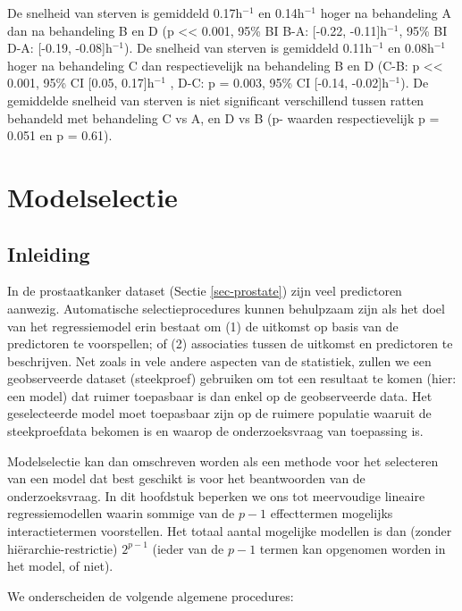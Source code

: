 \documentclass[
  dutch,
  letterpaper,
  12pt]{book}
\theoremstyle{definition}
\theoremstyle{definition}
\theoremstyle{definition}
\theoremstyle{remark}
\begin{document}
De snelheid van sterven is gemiddeld 0.17h\(^{-1}\) en 0.14h\(^{-1}\)
hoger na behandeling A dan na behandeling B en D (p \textless\textless{}
0.001, 95\% BI B-A: {[}-0.22, -0.11{]}h\(^{-1}\), 95\% BI D-A: {[}-0.19,
-0.08{]}h\(^{-1}\)). De snelheid van sterven is gemiddeld 0.11h\(^{-1}\)
en 0.08h\(^{-1}\) hoger na behandeling C dan respectievelijk na
behandeling B en D (C-B: p \textless\textless{} 0.001, 95\% CI {[}0.05,
0.17{]}h\(^{-1}\) , D-C: p = 0.003, 95\% CI {[}-0.14,
-0.02{]}h\(^{-1}\)). De gemiddelde snelheid van sterven is niet
significant verschillend tussen ratten behandeld met behandeling C vs A,
en D vs B (p- waarden respectievelijk p = 0.051 en p = 0.61).


\chapter{Modelselectie}\label{sec-chap-modsel}

\section{Inleiding}\label{inleiding-10}

In de prostaatkanker dataset (Sectie \ref{sec-prostate}) zijn veel
predictoren aanwezig. Automatische selectieprocedures kunnen behulpzaam
zijn als het doel van het regressiemodel erin bestaat om (1) de uitkomst
op basis van de predictoren te voorspellen; of (2) associaties tussen de
uitkomst en predictoren te beschrijven. Net zoals in vele andere
aspecten van de statistiek, zullen we een geobserveerde dataset
(steekproef) gebruiken om tot een resultaat te komen (hier: een model)
dat ruimer toepasbaar is dan enkel op de geobserveerde data. Het
geselecteerde model moet toepasbaar zijn op de ruimere populatie waaruit
de steekproefdata bekomen is en waarop de onderzoeksvraag van toepassing
is.

Modelselectie kan dan omschreven worden als een methode voor het
selecteren van een model dat best geschikt is voor het beantwoorden van
de onderzoeksvraag. In dit hoofdstuk beperken we ons tot meervoudige
lineaire regressiemodellen waarin sommige van de \(p-1\) effecttermen
mogelijks interactietermen voorstellen. Het totaal aantal mogelijke
modellen is dan (zonder hiërarchie-restrictie) \(2^{p-1}\) (ieder van de
\(p-1\) termen kan opgenomen worden in het model, of niet).

We onderscheiden de volgende algemene procedures:
\end{document}
